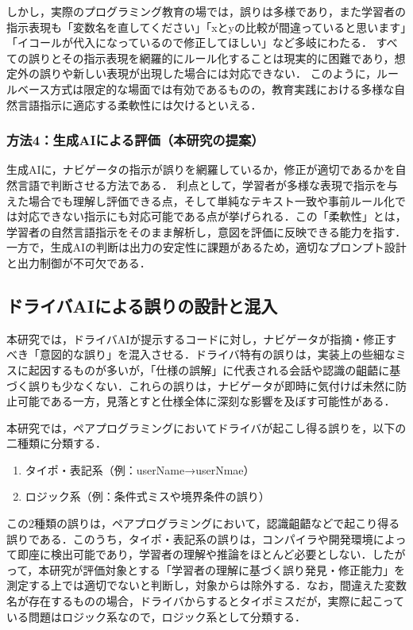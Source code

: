 \documentclass[twoside,twocolumn,10pt]{jsarticle}
\begin{document}
しかし，実際のプログラミング教育の場では，誤りは多様であり，また学習者の指示表現も「変数名を直してください」「xとyの比較が間違っていると思います」「イコールが代入になっているので修正してほしい」など多岐にわたる．  
すべての誤りとその指示表現を網羅的にルール化することは現実的に困難であり，想定外の誤りや新しい表現が出現した場合には対応できない．  
このように，ルールベース方式は限定的な場面では有効であるものの，教育実践における多様な自然言語指示に適応する柔軟性には欠けるといえる．

\subsubsection*{方法4：生成AIによる評価（本研究の提案）}
生成AIに，ナビゲータの指示が誤りを網羅しているか，修正が適切であるかを自然言語で判断させる方法である．  
利点として，学習者が多様な表現で指示を与えた場合でも理解し評価できる点，そして単純なテキスト一致や事前ルール化では対応できない指示にも対応可能である点が挙げられる．この「柔軟性」とは，学習者の自然言語指示をそのまま解析し，意図を評価に反映できる能力を指す．  
一方で，生成AIの判断は出力の安定性に課題があるため，適切なプロンプト設計と出力制御が不可欠である．

\subsection{ドライバAIによる誤りの設計と混入}
本研究では，ドライバAIが提示するコードに対し，ナビゲータが指摘・修正すべき「意図的な誤り」を混入させる．ドライバ特有の誤りは，実装上の些細なミスに起因するものが多いが，「仕様の誤解」に代表される会話や認識の齟齬に基づく誤りも少なくない．これらの誤りは，ナビゲータが即時に気付けば未然に防止可能である一方，見落とすと仕様全体に深刻な影響を及ぼす可能性がある．

本研究では，ペアプログラミングにおいてドライバが起こし得る誤りを，以下の二種類に分類する．

\begin{enumerate}
    \item タイポ・表記系（例：userName→userNmae）
    \item ロジック系（例：条件式ミスや境界条件の誤り）
\end{enumerate}

この2種類の誤りは，ペアプログラミングにおいて，認識齟齬などで起こり得る誤りである．このうち，タイポ・表記系の誤りは，コンパイラや開発環境によって即座に検出可能であり，学習者の理解や推論をほとんど必要としない．したがって，本研究が評価対象とする「学習者の理解に基づく誤り発見・修正能力」を測定する上では適切でないと判断し，対象からは除外する．なお，間違えた変数名が存在するものの場合，ドライバからするとタイポミスだが，実際に起こっている問題はロジック系なので，ロジック系として分類する．
\end{document}
